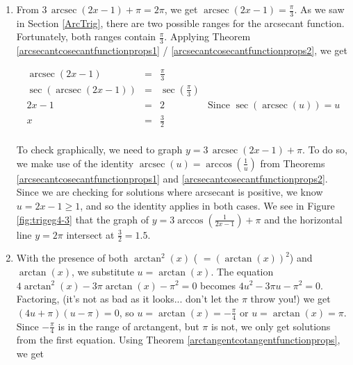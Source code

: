 {\begin{enumerate}
\item From $3 \, \operatorname{arcsec}(2x-1) + \pi = 2 \pi$, we get $\operatorname{arcsec}(2x-1) = \frac{\pi}{3}$.  As we saw in Section \ref{ArcTrig}, there are two possible ranges for the arcsecant function.  Fortunately, both ranges contain $\frac{\pi}{3}$.  Applying Theorem \ref{arcsecantcosecantfunctionprops1} / \ref{arcsecantcosecantfunctionprops2}, we get

\[ \begin{array}{rclr}

\operatorname{arcsec}(2x-1)& = & \frac{\pi}{3} & \\ [5pt]
\sec(\operatorname{arcsec}(2x-1)) & = & \sec\left(\frac{\pi}{3}\right) & \\ [5pt]
2x -1 & = & 2 & \text{Since $\sec(\operatorname{arcsec}(u)) = u$} \\ [5pt]
    x & = & \frac{3}{2} \\ \end{array} \]

\drawexampleline

To check graphically, we need to graph $y=3 \, \operatorname{arcsec}(2x-1) + \pi$.  To do so, we make use of the identity $\operatorname{arcsec}(u) = \arccos\left(\frac{1}{u}\right)$ from Theorems \ref{arcsecantcosecantfunctionprops1} and \ref{arcsecantcosecantfunctionprops2}. Since we are checking for solutions where arcsecant is positive, we know $u = 2x-1 \geq 1$, and so the identity applies in both cases. We see in Figure \ref{fig:trigeg4-3} that the graph of $y=3 \arccos\left(\frac{1}{2x-1}\right) + \pi$ and the horizontal line $y = 2\pi$ intersect at $\frac{3}{2} = 1.5$.


\item  With the presence of both $\arctan^{2}(x)$ ( $= (\arctan(x))^2$) and $\arctan(x)$, we substitute $u = \arctan(x)$.  The equation  $4\arctan^2(x)-3\pi \arctan(x)-\pi^2 = 0$ becomes $4u^2 -3\pi u - \pi^2 = 0$.  Factoring, (it's not as bad as it looks...  don't let the $\pi$ throw you!) we get $(4u+\pi)(u - \pi) = 0$, so $u = \arctan(x) = -\frac{\pi}{4}$ or $u = \arctan(x) = \pi$.  Since $-\frac{\pi}{4}$ is in the range of arctangent, but $\pi$ is not, we only get solutions from the first equation.  Using Theorem \ref{arctangentcotangentfunctionprops}, we get

\[ \begin{array}{rclr}


\end{array}\]
\end{enumerate}}
